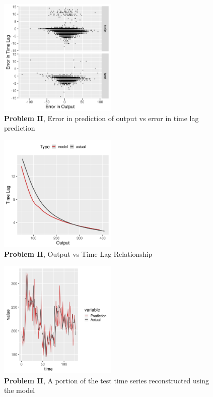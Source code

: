 \documentclass[envcountsect,runningheads]{llncs}
\theoremstyle{etoile}
\begin{document}
\begin{figure}[h]
\vspace{.3in}
\centerline{\includegraphics[width=0.5\textwidth]{figures/exp2_scatter_errors.png}}
\vspace{.3in}
\caption{\textbf{Problem II}, Error in prediction of output vs error in time lag prediction}
\label{fig:problem2_error}
\end{figure}


\begin{figure}[h]
\vspace{.3in}
\centerline{\includegraphics[width=0.5\textwidth]{figures/exp2_predictive_curves.png}}
\vspace{.3in}
\caption{\textbf{Problem II}, Output vs Time Lag Relationship}
\label{fig:problem2_curves}
\end{figure}

\begin{figure}[h]
\vspace{.3in}
\centerline{\includegraphics[width=0.5\textwidth]{figures/exp2_timeseries_pred.png}}
\vspace{.3in}
\caption{\textbf{Problem II}, A portion of the test time series reconstructed using the model}
\label{fig:problem2_timeseries}
\end{figure}
\end{document}
